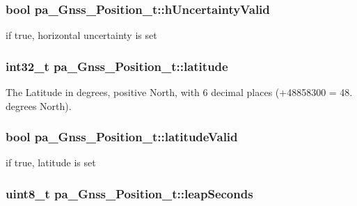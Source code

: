 \subsubsection[{\texorpdfstring{h\+Uncertainty\+Valid}{hUncertaintyValid}}]{\setlength{\rightskip}{0pt plus 5cm}bool pa\+\_\+\+Gnss\+\_\+\+Position\+\_\+t\+::h\+Uncertainty\+Valid}\hypertarget{structpa___gnss___position__t_a6f34e02db6085135cedef788b18dfefd}{}\label{structpa___gnss___position__t_a6f34e02db6085135cedef788b18dfefd}


if true, horizontal uncertainty is set 

\subsubsection[{\texorpdfstring{latitude}{latitude}}]{\setlength{\rightskip}{0pt plus 5cm}int32\+\_\+t pa\+\_\+\+Gnss\+\_\+\+Position\+\_\+t\+::latitude}\hypertarget{structpa___gnss___position__t_a0544257c9cb5080b7e85cfd8547347d8}{}\label{structpa___gnss___position__t_a0544257c9cb5080b7e85cfd8547347d8}
The Latitude in degrees, positive North, with 6 decimal places (+48858300 = 48. degrees North). 
\subsubsection[{\texorpdfstring{latitude\+Valid}{latitudeValid}}]{\setlength{\rightskip}{0pt plus 5cm}bool pa\+\_\+\+Gnss\+\_\+\+Position\+\_\+t\+::latitude\+Valid}\hypertarget{structpa___gnss___position__t_a82987bddbfd0e90d1b11cdc513c170ed}{}\label{structpa___gnss___position__t_a82987bddbfd0e90d1b11cdc513c170ed}


if true, latitude is set 

\subsubsection[{\texorpdfstring{leap\+Seconds}{leapSeconds}}]{\setlength{\rightskip}{0pt plus 5cm}uint8\+\_\+t pa\+\_\+\+Gnss\+\_\+\+Position\+\_\+t\+::leap\+Seconds}\hypertarget{structpa___gnss___position__t_ae648725ad4a96e7829c1be80e5c98d48}{}\label{structpa___gnss___position__t_ae648725ad4a96e7829c1be80e5c98d48}


